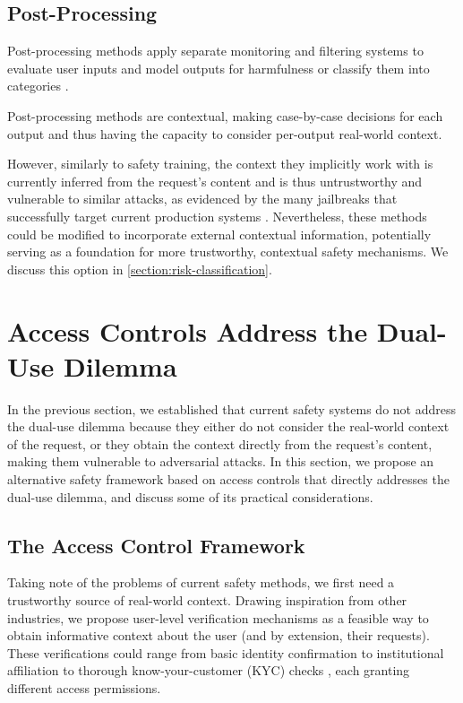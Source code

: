 \documentclass{article}
\theoremstyle{plain}
\theoremstyle{definition}
\theoremstyle{remark}
\begin{document}
\subsection{Post-Processing}

Post-processing methods apply separate monitoring and filtering
systems to evaluate user inputs and model outputs for harmfulness
\cite{inan2023llamaguardllmbasedinputoutput,
sharma2025constitutionalclassifiersdefendinguniversal} or classify
them into categories \cite{handa2025economictasksperformedai}.

Post-processing methods are contextual, making case-by-case decisions
for each output and thus having the capacity to consider per-output
real-world context.

However, similarly to safety training, the context they implicitly
work with is currently inferred from the request's content and is
thus untrustworthy and vulnerable to similar attacks, as evidenced by
the many jailbreaks that successfully target current production
systems \cite{zhang2025outputconstraintsattacksurface}. Nevertheless,
these methods could be modified to incorporate external contextual
information, potentially serving as a foundation for more
trustworthy, contextual safety mechanisms. We discuss this option in
\cref{section:risk-classification}.

\section{Access Controls Address the Dual-Use Dilemma}
\label{section:access-controls}

In the previous section, we established that current safety systems
do not address the dual-use dilemma because they either do not
consider the real-world context of the request, or they obtain the
context directly from the request's content, making them vulnerable
to adversarial attacks. In this section, we propose an alternative
safety framework based on access controls that directly addresses the
dual-use dilemma, and discuss some of its practical considerations.

\subsection{The Access Control Framework}

Taking note of the problems of current safety methods, we first need
a trustworthy source of real-world context. Drawing inspiration from
other industries, we propose user-level verification mechanisms as a
feasible way to obtain informative context about the user (and by
extension, their requests). These verifications could range from
basic identity confirmation to institutional affiliation to thorough
know-your-customer (KYC) checks \cite{FATF2025}, each granting
different access permissions.
\end{document}

